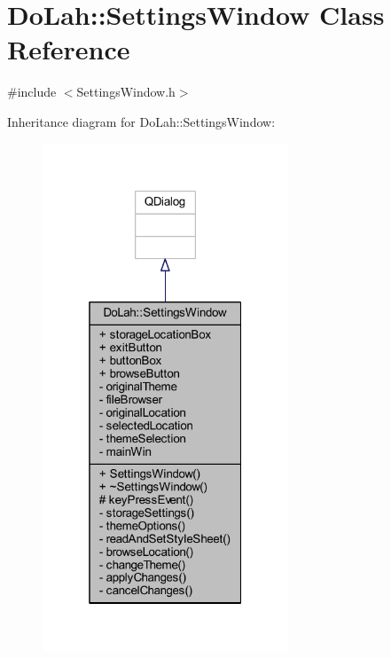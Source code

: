 \hypertarget{class_do_lah_1_1_settings_window}{}\section{Do\+Lah\+:\+:Settings\+Window Class Reference}
\label{class_do_lah_1_1_settings_window}


{\ttfamily \#include $<$Settings\+Window.\+h$>$}



Inheritance diagram for Do\+Lah\+:\+:Settings\+Window\+:\nopagebreak
\begin{figure}[H]
\begin{center}
\leavevmode
\includegraphics[width=208pt]{class_do_lah_1_1_settings_window__inherit__graph}
\end{center}
\end{figure}


